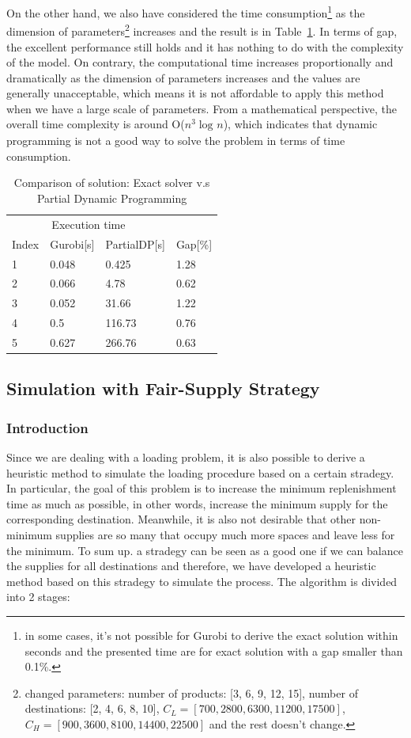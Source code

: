\documentclass{article}
\begin{document}
On the other hand, we also have considered the time consumption\footnote{in some cases, it's not possible for Gurobi to derive the exact solution within seconds and the presented time are for exact solution with a gap smaller than 0.1\%.} as the dimension of parameters\footnote{changed parameters: number of products: [3, 6, 9, 12, 15], number of destinations: [2, 4, 6, 8, 10], $C_L=[700, 2800, 6300, 11200, 17500]$, $C_H=[900, 3600, 8100, 14400, 22500]$ and the rest doesn't change.} increases and the result is in Table~\ref{tab:exact_heu1}. In terms of gap, the excellent performance still holds and it has nothing to do with the complexity of the model. On contrary, the computational time increases proportionally and dramatically as the dimension of parameters increases and the values are generally unacceptable, which means it is not affordable to apply this method when we have a large scale of parameters. From a mathematical perspective, the overall time complexity is around O($n^3\log_{}n$), which indicates that dynamic programming is not a good way to solve the problem in terms of time consumption.

\begin{table}[ht]
 \caption{Comparison of solution: Exact solver v.s Partial Dynamic Programming}
  \centering
  \begin{tabular}{llll}
    \toprule
    \multicolumn{3}{c}{Execution time}                   \\
    \cmidrule(r){2-3}
    Index   & Gurobi[s]     & PartialDP[s]      & Gap[\%] \\
    \midrule
    1	&	0.048	&	0.425	&	1.28	\\
    2	&	0.066	&	4.78	&	0.62	\\
    3	&	0.052	&	31.66	&	1.22	\\
    4	&	0.5	&	116.73	&	0.76	\\
    5	&	0.627	&	266.76	&	0.63	\\
    \bottomrule
  \end{tabular}
  \label{tab:exact_heu1}
\end{table}

\subsection{Simulation with Fair-Supply Strategy}

\subsubsection{Introduction}
Since we are dealing with a loading problem, it is also possible to derive a heuristic method to simulate the loading procedure based on a certain stradegy. In particular, the goal of this problem is to increase the minimum replenishment time as much as possible, in other words, increase the minimum supply for the corresponding destination. Meanwhile, it is also not desirable that other non-minimum supplies are so many that occupy much more spaces and leave less for the minimum. To sum up. a stradegy can be seen as a good one if we can balance the supplies for all destinations and therefore, we have developed a heuristic method based on this stradegy to simulate the process. The algorithm is divided into 2 stages:
\end{document}
